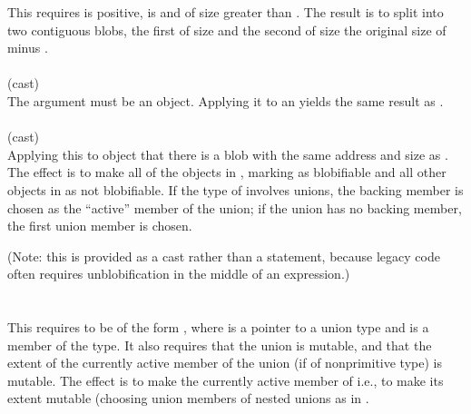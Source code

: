 \documentclass[preprint,nocopyrightspace]{sigplanconf}
\begin{document}
{{{This requires  is positive,  is \vcc{\mutable} and of size greater
than . The result is to split  into two contiguous
blobs, the first of size  and the second of size the original
size of  minus .
\\\\
 (cast)\\
The argument must be an object.
Applying it to an  yields
the same result as .
\\\\
 (cast)\\
Applying this to object 
 that there is a \vcc{\wrapped} blob with the same
address and size as . The effect is to make all of the objects
in  \vcc{\mutable}, marking  as blobifiable and
all other objects in  as not blobifiable. If
the type of  involves unions, the backing member is chosen as
the ``active'' member of the union; if the union has no backing
member, the first union member is chosen.

(Note: this is provided as a cast rather than a statement, because
legacy code often requires unblobification in the middle of an expression.)
\\\\
\\
This requires  to be of the form , where  is
a pointer to a union type and  is a member of the type. It also
requires that the union is mutable, and that the extent of the currently active
member of the union (if of nonprimitive type) is mutable. The effect
is to make  the currently active member of  i.e., to make
its extent mutable (choosing union members of nested unions as
in . 

}}}
\end{document}
